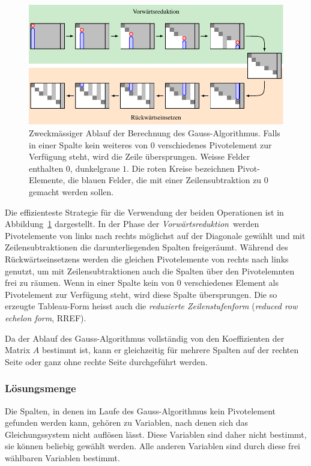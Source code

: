 \begin{figure}
\centering
\includegraphics[width=\textwidth]{chapters/10-vektorenmatrizen/images/rref.pdf}
\caption{Zweckmässiger Ablauf der Berechnung des Gauss-Algorithmus.
Falls in einer Spalte kein weiteres von $0$ verschiedenes Pivotelement
zur Verfügung steht, wird die Zeile übersprungen.
Weisse Felder enthalten $0$, dunkelgraue $1$.
Die roten Kreise bezeichnen Pivot-Elemente, die blauen Felder,
die mit einer Zeilensubtraktion zu $0$ gemacht werden sollen.
\label{buch:grundlagen:fig:gaussalgorithmus}}
\end{figure}
Die effizienteste Strategie für die Verwendung der beiden Operationen
ist in Abbildung~\ref{buch:grundlagen:fig:gaussalgorithmus} dargestellt.
In der Phase der {\em Vorwärtsreduktion} werden Pivotelemente von links
nach rechts möglichst auf der Diagonale gewählt und mit Zeilensubtraktionen
die darunterliegenden Spalten freigeräumt.
%
Während des Rückwärtseinsetzens werden die gleichen Pivotelemente von
rechts nach links genutzt, um mit Zeilensubtraktionen auch die
Spalten über den Pivotelemnten frei zu räumen.
%
Wenn in einer Spalte kein von $0$ verschiedenes Element als Pivotelement
zur Verfügung steht, wird diese Spalte übersprungen.
Die so erzeugte Tableau-Form heisst auch die {\em reduzierte Zeilenstufenform}
({\em reduced row echelon form}, RREF).
%
%

Da der Ablauf des Gauss-Algorithmus vollständig von den Koeffizienten der
Matrix $A$ bestimmt ist, kann er gleichzeitig für mehrere Spalten auf der
rechten Seite oder ganz ohne rechte Seite durchgeführt werden.

\subsubsection{Lösungsmenge}
%
Die Spalten, in denen im Laufe des Gauss-Algorithmus kein Pivotelement
gefunden werden kann, gehören zu Variablen, nach denen sich das
Gleichungssystem nicht auflösen lässt.
Diese Variablen sind daher nicht bestimmt, sie können beliebig gewählt
werden.
Alle anderen Variablen sind durch diese frei wählbaren Variablen
bestimmt.

